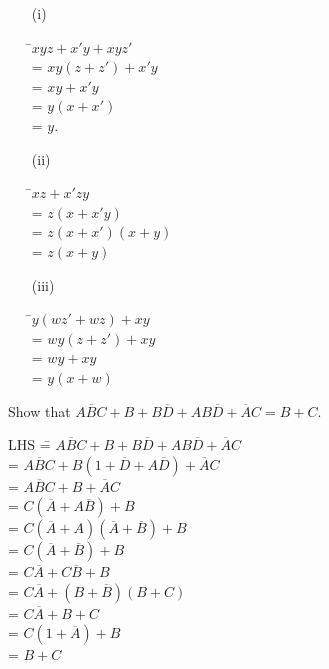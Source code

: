 \begin{solution}
\begin{itemize}
\item[(i)]
\begin{tabbing}
\phantom{AAAAA} \=\quad $xyz+x'y+xyz'$\\[3pt]
\>= $xy(z+z')+x'y$\\[3pt]
\>= $xy+x'y$\\[3pt]
\>= $y(x+x')$\\[3pt]
\>= $y$.
\end{tabbing}

\item[(ii)]
\begin{tabbing}
\=\quad $xz+x'zy$\\[3pt]
\>= $z(x+x'y)$\\[3pt]
\>= $z(x+x')(x+y)$\\[3pt]
\>= $z(x+y)$
\end{tabbing}

\item[(iii)]
\begin{tabbing}
\=\quad $y(wz'+wz)+xy$\\[3pt]
\>= $wy(z+z')+xy$\\[3pt]
\>= $wy+xy$\\[3pt]
\>= $y(x+w)$
\end{tabbing}
\end{itemize}
\end{solution}

\begin{problem}\label{prob5.61}
Show that $A\overline{B}C+B+B\overline{D}+AB\overline{D}+\overline{A}C=B+C$.
\end{problem}

\begin{solution}
\begin{tabbing}
\phantom{AAAAAA} LHS \== $A\overline{B}C+B+B\overline{D}+AB\overline{D}+\overline{A}C$\\[3pt]
    \>= $A\overline{B}C+B(1+\overline{D}+A\overline{D})+\overline{A}C$\\[3pt]
    \>= $A\overline{B}C+B+\overline{A}C$\\[3pt]
    \>= $C(\overline{A}+A\overline{B})+B$\\[3pt]
    \>= $C(\overline{A}+A)(\overline{A}+\overline{B})+B$\\[3pt]
    \>= $C(\overline{A}+\overline{B})+B$\\[3pt]
    \>= $C\overline{A}+C\overline{B}+B$\\[3pt]
    \>= $C\overline{A}+(B+\overline{B})(B+C)$\\[3pt]
    \>= $C\overline{A}+B+C$\\[3pt]
    \>= $C(1+\overline{A})+B$\\[3pt]
    \>= $B+C$ 
\end{tabbing}
\end{solution}

